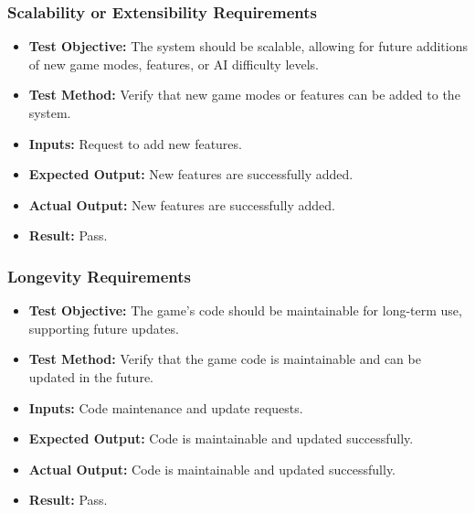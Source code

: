 \documentclass[12pt, titlepage]{article}
\begin{document}
\subsubsection{Scalability or Extensibility Requirements}
\begin{itemize}
    \item \textbf{Test Objective:} The system should be scalable, allowing for future additions of new game modes, features, or AI difficulty levels.
    \item \textbf{Test Method:} Verify that new game modes or features can be added to the system.
    \item \textbf{Inputs:} Request to add new features.
    \item \textbf{Expected Output:} New features are successfully added.
    \item \textbf{Actual Output:} New features are successfully added.
    \item \textbf{Result:} Pass.
\end{itemize}

\subsubsection{Longevity Requirements}
\begin{itemize}
    \item \textbf{Test Objective:} The game’s code should be maintainable for long-term use, supporting future updates.
    \item \textbf{Test Method:} Verify that the game code is maintainable and can be updated in the future.
    \item \textbf{Inputs:} Code maintenance and update requests.
    \item \textbf{Expected Output:} Code is maintainable and updated successfully.
    \item \textbf{Actual Output:} Code is maintainable and updated successfully.
    \item \textbf{Result:} Pass.
\end{itemize}
\end{document}
